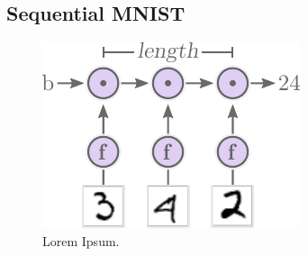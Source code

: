 \subsection{Sequential MNIST}


\begin{figure}[H]
\centering
\includegraphics[scale=1]{graphics/mnist_sequence_problem.pdf}
\caption{Lorem Ipsum.}
\end{figure}


